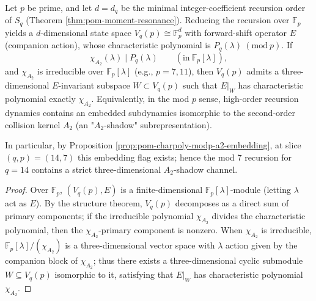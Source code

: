 \begin{corollary}\label{cor:pom-charpoly-modp-a2-subdynamics}
Let \(p\) be prime, and let \(d=d_q\) be the minimal integer-coefficient recursion order of \(S_q\) (Theorem \ref{thm:pom-moment-resonance}).
Reducing the recursion over \(\mathbb{F}_p\) yields a \(d\)-dimensional state space \(V_q(p)\cong\mathbb{F}_p^{d}\) with forward-shift operator \(E\) (companion action), whose characteristic polynomial is \(P_q(\lambda)\ (\mathrm{mod}\ p)\).
If
\[
\chi_{A_2}(\lambda)\mid P_q(\lambda)\qquad(\mathrm{in}\ \mathbb{F}_p[\lambda]),
\]
and \(\chi_{A_2}\) is irreducible over \(\mathbb{F}_p[\lambda]\) (e.g., \(p=7,11\)),
then \(V_q(p)\) admits a three-dimensional \(E\)-invariant subspace \(W\subset V_q(p)\) such that \(E|_{W}\) has characteristic polynomial exactly \(\chi_{A_2}\).
Equivalently, in the mod \(p\) sense, high-order recursion dynamics contains an embedded subdynamics isomorphic to the second-order collision kernel \(A_2\) (an "\(A_2\)-shadow" subrepresentation).
\par
In particular, by Proposition \ref{prop:pom-charpoly-modp-a2-embedding}, at slice \((q,p)=(14,7)\) this embedding flag exists; hence the mod \(7\) recursion for \(q=14\) contains a strict three-dimensional \(A_2\)-shadow channel.
\end{corollary}
\begin{proof}
Over \(\mathbb{F}_p\), \((V_q(p),E)\) is a finite-dimensional \(\mathbb{F}_p[\lambda]\)-module (letting \(\lambda\) act as \(E\)).
By the structure theorem, \(V_q(p)\) decomposes as a direct sum of primary components; if the irreducible polynomial \(\chi_{A_2}\) divides the characteristic polynomial, then the \(\chi_{A_2}\)-primary component is nonzero.
When \(\chi_{A_2}\) is irreducible, \(\mathbb{F}_p[\lambda]/(\chi_{A_2})\) is a three-dimensional vector space with \(\lambda\) action given by the companion block of \(\chi_{A_2}\); thus there exists a three-dimensional cyclic submodule \(W\subseteq V_q(p)\) isomorphic to it, satisfying that \(E|_W\) has characteristic polynomial \(\chi_{A_2}\).
\end{proof}

